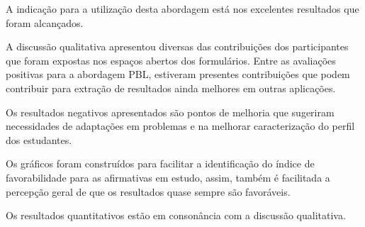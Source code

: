 A indicação para a utilização desta abordagem está
nos excelentes resultados que foram alcançados.

A discussão qualitativa apresentou diversas das contribuições
dos participantes que foram expostas nos espaços abertos dos
formulários.
Entre as avaliações positivas para a abordagem \ac{PBL},
estiveram presentes contribuições que podem contribuir para
extração de resultados ainda melhores em outras aplicações.

Os resultados negativos apresentados são pontos de
melhoria que sugeriram necessidades de adaptações
em problemas e na melhorar caracterização do perfil
dos estudantes.

Os gráficos foram construídos para facilitar a identificação
do índice de favorabilidade para as afirmativas em estudo, assim,
também é facilitada a percepção geral de que os resultados quase
sempre são favoráveis.

Os resultados quantitativos estão em consonância com a discussão
qualitativa.
